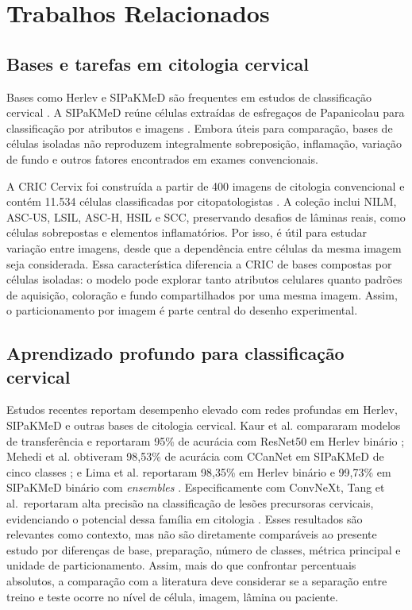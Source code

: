 \section{Trabalhos Relacionados}

\subsection{Bases e tarefas em citologia cervical}

Bases como Herlev e SIPaKMeD são frequentes em estudos de classificação
cervical \cite{jiang2023systematic,fang2024systematic}. A SIPaKMeD reúne
células extraídas de esfregaços de Papanicolau para classificação por atributos
e imagens \cite{plissiti2018sipakmed}. Embora úteis para comparação, bases de
células isoladas não reproduzem integralmente sobreposição, inflamação,
variação de fundo e outros fatores encontrados em exames convencionais.

A CRIC Cervix foi construída a partir de 400 imagens de citologia convencional
e contém 11.534 células classificadas por citopatologistas
\cite{rezende2021cric}. A coleção inclui NILM, ASC-US, LSIL, ASC-H, HSIL e
SCC, preservando desafios de lâminas reais, como células sobrepostas e
elementos inflamatórios. Por isso, é útil para estudar variação entre imagens,
desde que a dependência entre células da mesma imagem seja considerada.
Essa característica diferencia a CRIC de bases compostas por células isoladas:
o modelo pode explorar tanto atributos celulares quanto padrões de aquisição,
coloração e fundo compartilhados por uma mesma imagem. Assim, o particionamento
por imagem é parte central do desenho experimental.

\subsection{Aprendizado profundo para classificação cervical}

Estudos recentes reportam desempenho elevado com redes profundas em Herlev,
SIPaKMeD e outras bases de citologia cervical. Kaur et al. compararam modelos
de transferência e reportaram 95\% de acurácia com ResNet50 em Herlev binário
\cite{kaur2025comparison}; Mehedi et al. obtiveram 98,53\% de acurácia com
CCanNet em SIPaKMeD de cinco classes \cite{mehedi2024lightweight}; e Lima et
al. reportaram 98,35\% em Herlev binário e 99,73\% em SIPaKMeD binário com
\emph{ensembles} \cite{lima2025ensemble}. Especificamente com ConvNeXt, Tang et
al.\ reportaram alta precisão na classificação de lesões precursoras cervicais,
evidenciando o potencial dessa família em citologia \cite{tang2023convnext}.
Esses resultados são relevantes como
contexto, mas não são diretamente comparáveis ao presente estudo por diferenças
de base, preparação, número de classes, métrica principal e unidade de
particionamento. Assim, mais do que confrontar percentuais absolutos, a
comparação com a literatura deve considerar se a separação entre treino e teste
ocorre no nível de célula, imagem, lâmina ou paciente.

